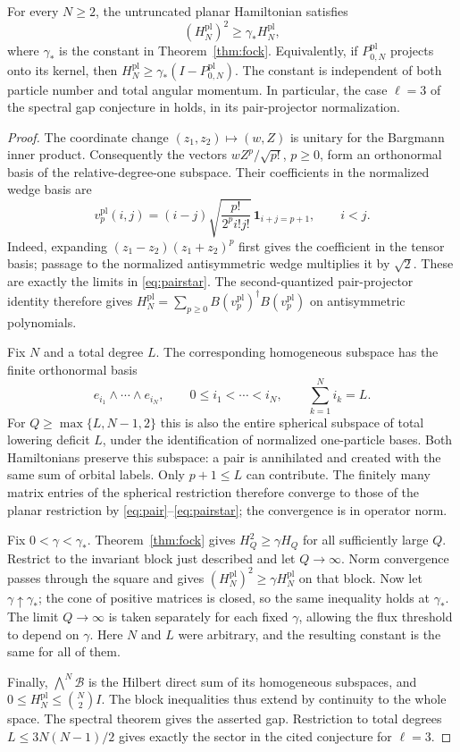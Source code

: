 \begin{corollary}\label{cor:plane}
For every $N\ge2$, the untruncated planar Hamiltonian satisfies
\[
 (H_N^{\mathrm{pl}})^2\ge\gamma_* H_N^{\mathrm{pl}},
\]
where $\gamma_*$ is the constant in Theorem~\ref{thm:fock}.
Equivalently, if $P_{0,N}^{\mathrm{pl}}$ projects onto its kernel, then
$H_N^{\mathrm{pl}}\ge\gamma_*(I-P_{0,N}^{\mathrm{pl}})$.
The constant is independent of both particle number and total angular
momentum.  In particular, the case $\ell=3$ of the spectral gap conjecture
in \cite[Conjecture~A.1]{Rougerie} holds, in its pair-projector normalization.
\end{corollary}
\begin{proof}
The coordinate change $(z_1,z_2)\mapsto(w,Z)$ is unitary for the
Bargmann inner product.  Consequently the vectors
$wZ^p/\sqrt{p!}$, $p\ge0$, form an orthonormal basis of the relative-degree-one
subspace.  Their coefficients in the normalized wedge basis are
\[
 v_p^{\mathrm{pl}}(i,j)
   =(i-j)\sqrt{\frac{p!}{2^p i!j!}}\,\mathbf1_{i+j=p+1},
 \qquad i<j.
\]
Indeed, expanding $(z_1-z_2)(z_1+z_2)^p$
first gives the coefficient in the tensor basis; passage to the normalized
antisymmetric wedge multiplies it by $\sqrt2$.  These are exactly the
limits in \eqref{eq:pairstar}.  The second-quantized pair-projector identity
therefore gives
$H_N^{\mathrm{pl}}=\sum_{p\ge0}B(v_p^{\mathrm{pl}})^\dagger B(v_p^{\mathrm{pl}})$
on antisymmetric polynomials.

Fix $N$ and a total degree $L$.  The corresponding homogeneous subspace
has the finite orthonormal basis
\[
 e_{i_1}\wedge\cdots\wedge e_{i_N},\qquad
 0\le i_1<\cdots<i_N,\qquad \sum_{k=1}^N i_k=L.
\]
For $Q\ge\max\{L,N-1,2\}$ this is also the entire spherical subspace of total
lowering deficit $L$, under the identification of normalized one-particle
bases.  Both Hamiltonians preserve this subspace: a pair is annihilated
and created with the same sum of orbital labels.  Only $p+1\le L$
can contribute.  The finitely many matrix entries of the spherical
restriction therefore converge to those of the planar restriction by
\eqref{eq:pair}--\eqref{eq:pairstar}; the convergence is in operator norm.

Fix $0<\gamma<\gamma_*$.  Theorem~\ref{thm:fock} gives
$H_Q^2\ge\gamma H_Q$ for all sufficiently large $Q$.
Restrict to the invariant block just described and let $Q\to\infty$.
Norm convergence passes through the square and gives
$(H_N^{\mathrm{pl}})^2\ge\gamma H_N^{\mathrm{pl}}$ on that block.
Now let $\gamma\uparrow\gamma_*$; the cone of positive matrices is closed,
so the same inequality holds at $\gamma_*$.  The limit $Q\to\infty$ is taken
separately for each fixed $\gamma$, allowing the flux threshold to depend
on $\gamma$.  Here $N$ and $L$ were arbitrary, and the resulting constant is the
same for all of them.

Finally, $\bigwedge^N\mathcal B$ is the Hilbert direct sum of its homogeneous
subspaces, and $0\le H_N^{\mathrm{pl}}\le\binom N2 I$.  The block inequalities
thus extend by continuity to the whole space.  The spectral theorem gives
the asserted gap.  Restriction to total degrees
$L\le3N(N-1)/2$ gives exactly the sector in the cited conjecture for
$\ell=3$.
\end{proof}
